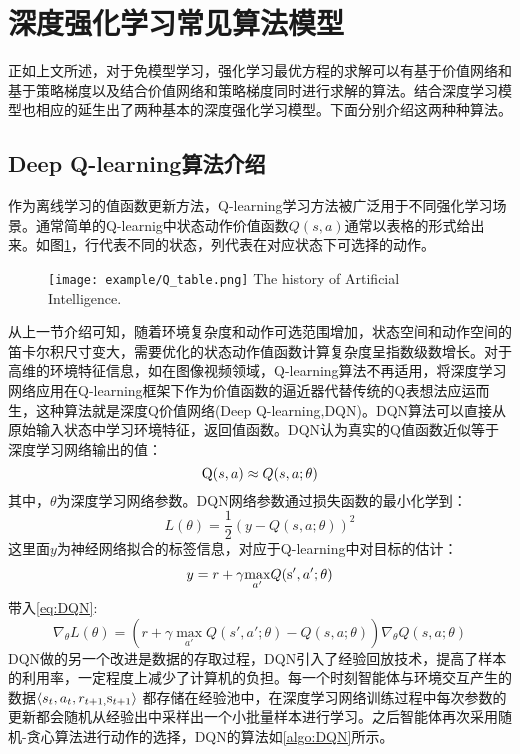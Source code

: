 \section{深度强化学习常见算法模型}
正如上文所述，对于免模型学习，强化学习最优方程的求解可以有基于价值网络和基于策略梯度以及结合价值网络和策略梯度同时进行求解的算法。结合深度学习模型也相应的延生出了两种基本的深度强化学习模型。下面分别介绍这两种种算法。
\subsection{Deep Q-learning算法介绍}
作为离线学习的值函数更新方法，Q-learning学习方法被广泛用于不同强化学习场景。通常简单的Q-learnig中状态动作价值函数$Q(s,a)$通常以表格的形式给出来。如图\ref{fig:8}，行代表不同的状态，列代表在对应状态下可选择的动作。
\begin{figure}[htpb]
	\centering
	\texttt{[image: example/Q\_table.png]}
	{The history of Artificial Intelligence.}
	\label{fig:8}
\end{figure}
从上一节介绍可知，随着环境复杂度和动作可选范围增加，状态空间和动作空间的笛卡尔积尺寸变大，需要优化的状态动作值函数计算复杂度呈指数级数增长。对于高维的环境特征信息，如在图像视频领域，Q-learning算法不再适用，将深度学习网络应用在Q-learning框架下作为价值函数的逼近器代替传统的Q表想法应运而生，这种算法就是深度Q价值网络(Deep Q-learning,DQN)。DQN算法可以直接从原始输入状态中学习环境特征，返回值函数。DQN认为真实的Q值函数近似等于深度学习网络输出的值：
\begin{equation}
	{\rm{Q}}(s,a) \approx Q(s,a;\theta )
\end{equation}
其中，$\theta $为深度学习网络参数。DQN网络参数通过损失函数的最小化学到：
\begin{equation}
\label{eq:DQN}
L(\theta ) = \frac{1}{2}{(y - Q(s,a;\theta ))^2}
\end{equation}
这里面$y$为神经网络拟合的标签信息，对应于Q-learning中对目标的估计：
\begin{equation}
y = r + \gamma {\max _{a'}}Q({\rm{s'}},a';\theta )
\end{equation}
带入\ref{eq:DQN}:
\begin{equation}
\label{eq:DQN2}
	{\nabla _\theta }L(\theta ) = (r + \gamma \mathop {\max }\limits_{a'} Q(s',a';\theta ) - Q(s,a;\theta )){\nabla _\theta }Q(s,a;\theta )
\end{equation}
DQN做的另一个改进是数据的存取过程，DQN引入了经验回放技术，提高了样本的利用率，一定程度上减少了计算机的负担。每一个时刻智能体与环境交互产生的数据$ \left\langle {{s_t},{a_t},{r_{t + 1,}}{{\rm{s}}_{t + 1}}} \right\rangle $ 都存储在经验池中，在深度学习网络训练过程中每次参数的更新都会随机从经验出中采样出一个小批量样本进行学习。之后智能体再次采用随机-贪心算法进行动作的选择，DQN的算法如\ref{algo:DQN}所示。

